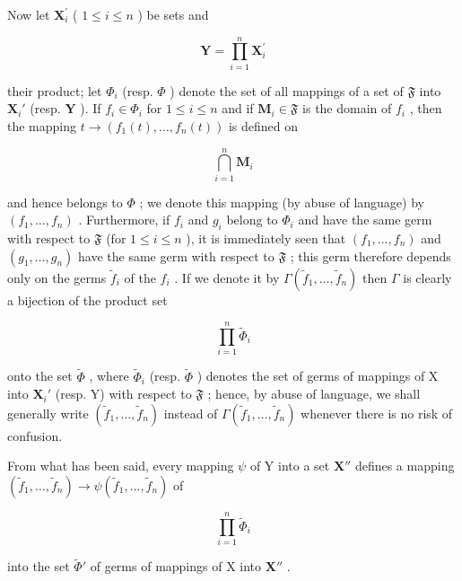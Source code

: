 Now let \(\mathbf{X}_i^{\prime}\) ( \(1 \leqslant i \leqslant n\) ) be sets and

\[
\mathbf {Y} = \prod_ {i = 1} ^ {n} \mathbf {X} _ {i} ^ {\prime}
\]

their product; let \(\Phi_i\) (resp. \(\Phi\) ) denote the set of all mappings of a set of \(\mathfrak{F}\) into \(\mathbf{X}_i'\) (resp. \(\mathbf{Y}\) ). If \(f_i \in \Phi_i\) for \(1 \leqslant i \leqslant n\) and if \(\mathbf{M}_i \in \mathfrak{F}\) is the domain of \(f_i\) , then the mapping \(t \to (f_1(t), \ldots, f_n(t))\) is defined on

\[
\bigcap_ {i = 1} ^ {n} \mathbf {M} _ {i}
\]

and hence belongs to \(\Phi\) ; we denote this mapping (by abuse of language) by \((f_1, \ldots, f_n)\) . Furthermore, if \(f_i\) and \(g_i\) belong to \(\Phi_i\) and have the same germ with respect to \(\mathfrak{F}\) (for \(1 \leqslant i \leqslant n\) ), it is immediately seen that \((f_1, \ldots, f_n)\) and \((g_1, \ldots, g_n)\) have the same germ with respect to \(\mathfrak{F}\) ; this germ therefore depends only on the germs \(\tilde{f}_i\) of the \(f_i\) . If we denote it by \(\Gamma(\tilde{f}_1, \ldots, \tilde{f}_n)\) then \(\Gamma\) is clearly a bijection of the product set

\[
\prod_ {i = 1} ^ {n} \tilde {\Phi} _ {i}
\]

onto the set \(\tilde{\Phi}\) , where \(\tilde{\Phi}_i\) (resp. \(\tilde{\Phi}\) ) denotes the set of germs of mappings of X into \(\mathbf{X}_i'\) (resp. Y) with respect to \(\mathfrak{F}\) ; hence, by abuse of language, we shall generally write \((\tilde{f}_1, \ldots, \tilde{f}_n)\) instead of \(\Gamma(\tilde{f}_1, \ldots, \tilde{f}_n)\) whenever there is no risk of confusion.

From what has been said, every mapping \(\psi\) of Y into a set \(\mathbf{X}''\) defines a mapping \((\tilde{f}_1, \ldots, \tilde{f}_n) \to \psi(\tilde{f}_1, \ldots, \tilde{f}_n)\) of

\[
\prod_ {i = 1} ^ {n} \tilde {\Phi} _ {i}
\]

into the set \(\tilde{\Phi}'\) of germs of mappings of X into \(\mathbf{X}''\) .

